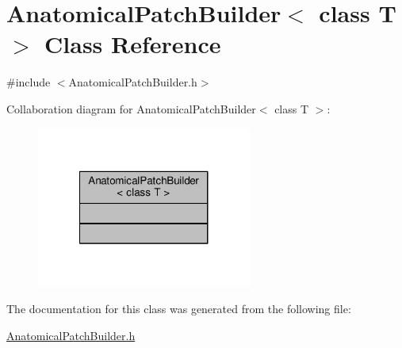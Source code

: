 \hypertarget{classAnatomicalPatchBuilder_3_01class_01T_01_4}{\section{Anatomical\-Patch\-Builder$<$ class T $>$ Class Reference}
\label{classAnatomicalPatchBuilder_3_01class_01T_01_4}
}


{\ttfamily \#include $<$Anatomical\-Patch\-Builder.\-h$>$}



Collaboration diagram for Anatomical\-Patch\-Builder$<$ class T $>$\-:
\nopagebreak
\begin{figure}[H]
\begin{center}
\leavevmode
\includegraphics[width=200pt]{classAnatomicalPatchBuilder_3_01class_01T_01_4__coll__graph}
\end{center}
\end{figure}


The documentation for this class was generated from the following file\-:\begin{DoxyCompactItemize}
\item 
\hyperlink{AnatomicalPatchBuilder_8h}{Anatomical\-Patch\-Builder.\-h}\end{DoxyCompactItemize}
